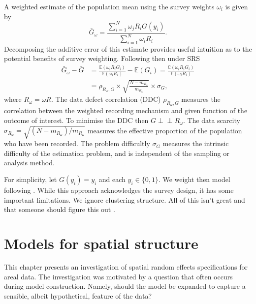\documentclass[a4paper, nobind]{templates/ociamthesis}
\begin{document}
A weighted estimate \autocite{hajek1971discussion} of the population mean using the survey weights \(\omega_i\) is given by
\begin{equation}
\bar G_\omega = \frac{\sum_{i = 1}^N \omega_j R_i G(y_i)}{\sum_{i = 1}^N \omega_i R_i}. \label{eq:hajek}
\end{equation}
Decomposing the additive error of this estimate provides useful intuition as to the potential benefits of survey weighting.
Following \textcite{meng2018statistical} then under SRS
\begin{align}
\bar G_\omega - \bar G &= \frac{\mathbb{E}(\omega_i R_i G_i)}{\mathbb{E}(\omega_i R_i)} - \mathbb{E}(G_i) = \frac{\mathbb{C}(\omega_i R_i G_i)}{\mathbb{E}(\omega_i R_i)} \\ 
&= \rho_{R_\omega, G} \times \sqrt{\frac{N - m_{R_\omega}}{m_{R_\omega}}} \times \sigma_G,
\end{align}
where \(R_\omega = \omega R\).
The data defect correlation (DDC) \(\rho_{R_\omega, G}\) measures the correlation between the weighted recording mechanism and given function of the outcome of interest.
To minimise the DDC then \(G \perp \!\!\! \perp R_\omega\).
The data scarcity \(\sigma_{R_\omega} = \sqrt{(N - m_{R_\omega})/m_{R_\omega}}\) measures the effective proportion of the population who have been recorded.
The problem difficultly \(\sigma_G\) measures the intrinsic difficulty of the estimation problem, and is independent of the sampling or analysis method.

For simplicity, let \(G(y_i) = y_i\) and each \(y_i \in \{0, 1\}\).
We weight then model following \textcite{chen2014use}.
While this approach acknowledges the survey design, it has some important limitations.
We ignore clustering structure.
All of this isn't great and that someone should figure this out \autocite{gelman2007struggles}.

\hypertarget{beyond-borders}{%
\chapter{Models for spatial structure}\label{beyond-borders}}

\adjustmtc
{}

This chapter presents an investigation of spatial random effects specifications for areal data.
The investigation was motivated by a question that often occurs during model construction.
Namely, should the model be expanded to capture a sensible, albeit hypothetical, feature of the data?
\end{document}
